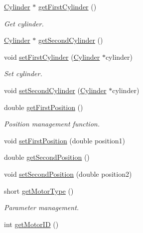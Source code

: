{\bf }\par
\begin{DoxyCompactItemize}
\item 
\hyperlink{classCylinder}{Cylinder} $\ast$ \hyperlink{classMotorGhost_a053864275b9a1badfe7f64bb41b024c0}{get\+First\+Cylinder} ()
\begin{DoxyCompactList}\small\item\em Get cylinder. \end{DoxyCompactList}\item 
\hyperlink{classCylinder}{Cylinder} $\ast$ \hyperlink{classMotorGhost_a0f9c7b8208d450277232df422cc96f2e}{get\+Second\+Cylinder} ()
\end{DoxyCompactItemize}

{\bf }\par
\begin{DoxyCompactItemize}
\item 
void \hyperlink{classMotorGhost_a61d840da18fe5a3a014694ae61b6feb6}{set\+First\+Cylinder} (\hyperlink{classCylinder}{Cylinder} $\ast$cylinder)
\begin{DoxyCompactList}\small\item\em Set cylinder. \end{DoxyCompactList}\item 
void \hyperlink{classMotorGhost_a37eb6c3fd66f16999b8c84e1d1f3e758}{set\+Second\+Cylinder} (\hyperlink{classCylinder}{Cylinder} $\ast$cylinder)
\end{DoxyCompactItemize}

{\bf }\par
\begin{DoxyCompactItemize}
\item 
double \hyperlink{classMotorGhost_a180f50ab8daecc3f09d4bc8200f1edff}{get\+First\+Position} ()
\begin{DoxyCompactList}\small\item\em Position management function. \end{DoxyCompactList}\item 
void \hyperlink{classMotorGhost_ad78f17ef57c3ccf90d2b78e554c3cf85}{set\+First\+Position} (double position1)
\item 
double \hyperlink{classMotorGhost_a1de3231a90ef1de485591f77bc52ef7a}{get\+Second\+Position} ()
\item 
void \hyperlink{classMotorGhost_aedc47fdd28d95809af9859a64a18117e}{set\+Second\+Position} (double position2)
\end{DoxyCompactItemize}

{\bf }\par
\begin{DoxyCompactItemize}
\item 
short \hyperlink{classMotorGhost_af0c78c2ed50a66cc57025fa818bda02b}{get\+Motor\+Type} ()
\begin{DoxyCompactList}\small\item\em Parameter management. \end{DoxyCompactList}\item 
int \hyperlink{classMotorGhost_a62ddebe9da16e27e0f3c9df23fc73bce}{get\+Motor\+I\+D} ()
\end{DoxyCompactItemize}

